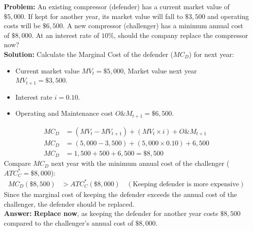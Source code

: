 \documentclass[12pt,a4paper]{article}
\begin{document}
\begin{tcolorbox}[examplebox, title={Example 2: Replacement Analysis}]
\textbf{Problem:} An existing compressor (defender) has a current market value of $\$5,000$. If kept for another year, its market value will fall to $\$3,500$ and operating costs will be $\$6,500$. A new compressor (challenger) has a minimum annual cost of $\$8,000$. At an interest rate of $10\%$, should the company replace the compressor now?\\[4pt]
\textbf{Solution:}
Calculate the Marginal Cost of the defender ($MC_D$) for next year:
\begin{itemize}[leftmargin=*, itemsep=2pt, topsep=2pt]
  \item Current market value $MV_t = \$5,000$, Market value next year $MV_{t+1} = \$3,500$.
  \item Interest rate $i = 0.10$.
  \item Operating and Maintenance cost $O\&M_{t+1} = \$6,500$.
\end{itemize}
\begin{align*}
  MC_D &= (MV_t - MV_{t+1}) + (MV_t \times i) + O\&M_{t+1} \\
  MC_D &= (5,000 - 3,500) + (5,000 \times 0.10) + 6,500 \\
  MC_D &= 1,500 + 500 + 6,500 = \$8,500
\end{align*}
Compare $MC_D$ next year with the minimum annual cost of the challenger ($ATC_C^* = \$8,000$):
\begin{align*}
  MC_D (\$8,500) &> ATC_C^* (\$8,000) \quad (\text{Keeping defender is more expensive})
\end{align*}
Since the marginal cost of keeping the defender exceeds the annual cost of the challenger, the defender should be replaced.\\[4pt]
\textbf{Answer:} \textbf{Replace now}, as keeping the defender for another year costs $\$8,500$ compared to the challenger's annual cost of $\$8,000$.
\end{tcolorbox}
\end{document}
